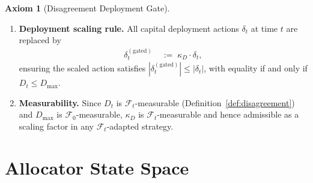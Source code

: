 \documentclass[12pt,openany]{book}
\numberwithin{equation}{chapter}
\theoremstyle{plain}
\theoremstyle{definition}
\newtheorem{axiom}[theorem]{Axiom}
\theoremstyle{remark}
\numberwithin{equation}{chapter}
\theoremstyle{plain}
\begin{document}
\begin{axiom}[Disagreement Deployment Gate]
\begin{enumerate}
  \item \textbf{Deployment scaling rule.}
        All capital deployment actions $\delta_t$ at time
        $t$ are replaced by
        \begin{align}
          \delta_t^{(\mathrm{gated})}
          &\;:=\; \kappa_D \cdot \delta_t,
          \label{eq:gated-deployment}
        \end{align}
        ensuring the scaled action satisfies
        $|\delta_t^{(\mathrm{gated})}| \leq |\delta_t|$,
        with equality if and only if $D_t \leq D_{\max}$.

  \item \textbf{Measurability.}
        Since $D_t$ is $\mathcal{F}_t$-measurable
        (Definition~\ref{def:disagreement}) and $D_{\max}$
        is $\mathcal{F}_0$-measurable, $\kappa_D$ is
        $\mathcal{F}_t$-measurable and hence admissible
        as a scaling factor in any $\mathcal{F}_t$-adapted
        strategy.
\end{enumerate}
\end{axiom}

\section{Allocator State Space}
\end{document}
